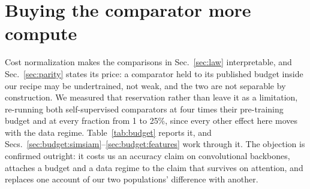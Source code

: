 \section{Buying the comparator more compute}\label{sec:budget}

 Cost normalization makes the comparisons in Sec.~\ref{sec:law}
interpretable, and Sec.~\ref{sec:parity} states its price: a comparator held
to its published budget inside our recipe may be undertrained, not weak, and
the two are not separable by construction. We measured that reservation rather
than leave it as a limitation, re-running both self-supervised comparators at
four times their pre-training budget and at every fraction from 1 to 25\%,
since every other effect here moves with the data regime.
Table~\ref{tab:budget} reports it, and
Secs.~\ref{sec:budget:simsiam}--\ref{sec:budget:features} work through it.
The objection is confirmed outright: it costs us an accuracy claim on
convolutional backbones, attaches a budget and a data regime to the claim that
survives on attention, and replaces one account of our two populations'
difference with another.

